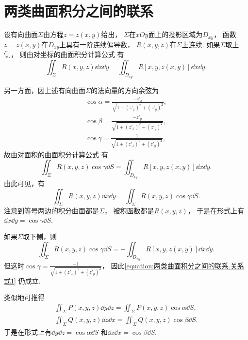 \section{两类曲面积分之间的联系}
设有向曲面\(\Sigma\)由方程\(z = z(x,y)\)给出，
\(\Sigma\)在\(xOy\)面上的投影区域为\(D_{xy}\)，
函数\(z = z(x,y)\)在\(D_{xy}\)上具有一阶连续偏导数，
\(R(x,y,z)\)在\(\Sigma\)上连续.
如果\(\Sigma\)取上侧，
则由对坐标的曲面积分计算公式  有\begin{equation*}
	\iint_\Sigma R(x,y,z) \dd{x}\dd{y} = \iint_{D_{xy}} R[x,y,z(x,y)] \dd{x}\dd{y}.
\end{equation*}

另一方面，因上述有向曲面\(\Sigma\)的法向量的方向余弦为\begin{equation*}
	\begin{split}
		\cos\alpha=\frac{-z'_x}{\sqrt{1+(z'_x)^2+(z'_y)^2}}, \\
		\cos\beta=\frac{-z'_y}{\sqrt{1+(z'_x)^2+(z'_y)^2}}, \\
		\cos\gamma=\frac{1}{\sqrt{1+(z'_x)^2+(z'_y)^2}},
	\end{split}
\end{equation*}
故由对面积的曲面积分计算公式  有\begin{equation*}
	\iint_\Sigma R(x,y,z) \cos\gamma \dd{S}
	= \iint_{D_{xy}} R[x,y,z(x,y)] \dd{x}\dd{y}.
\end{equation*}
由此可见，有\begin{equation}\label{equation:两类曲面积分之间的联系.关系式1}
	\iint_\Sigma R(x,y,z) \dd{x}\dd{y}
	= \iint_\Sigma R(x,y,z) \cos\gamma \dd{S}.
\end{equation}
注意到等号两边的积分曲面都是\(\Sigma\)，
被积函数都是\(R(x,y,z)\)，
于是在形式上有\(\dd{x}\dd{y} = \cos\gamma \dd{S}\).

如果\(\Sigma\)取下侧，则\begin{equation*}
	\iint_\Sigma R(x,y,z) \cos\gamma \dd{S}
	= -\iint_{D_{xy}} R[x,y,z(x,y)] \dd{x}\dd{y}.
\end{equation*}
但这时\(\cos\gamma=\frac{-1}{\sqrt{1+(z'_x)^2+(z'_y)^2}}\)，
因此\cref{equation:两类曲面积分之间的联系.关系式1} 仍成立.

类似地可推得\begin{gather}
	\iint_\Sigma P(x,y,z) \dd{y}\dd{z}
	= \iint_\Sigma P(x,y,z) \cos\alpha \dd{S},
	\label{equation:两类曲面积分之间的联系.关系式2} \\
	\iint_\Sigma Q(x,y,z) \dd{z}\dd{x}
	= \iint_\Sigma Q(x,y,z) \cos\beta \dd{S}.
	\label{equation:两类曲面积分之间的联系.关系式3}
\end{gather}
于是在形式上有\(\dd{y}\dd{z} = \cos\alpha \dd{S}\)
和\(\dd{z}\dd{x} = \cos\beta \dd{S}\).

